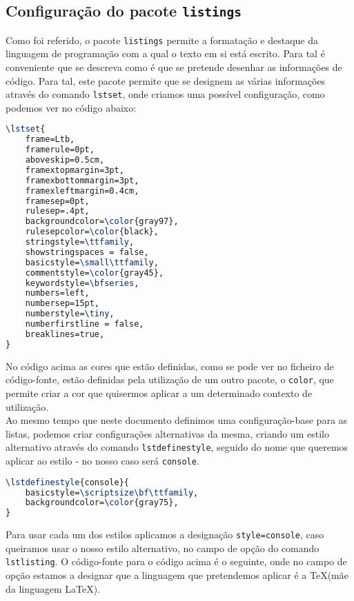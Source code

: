 \documentclass[a4paper, onecolumn, 10pt]{report}
\begin{document}
\subsection{Configuração do pacote \texttt{listings}}

Como foi referido, o pacote \texttt{listings} permite a formatação e destaque da linguagem de programação com a qual o texto em si está escrito. Para tal
é conveniente que se descreva como é que se pretende desenhar as informações de código. Para tal, este pacote permite que se designem as várias informações
através do comando \texttt{lstset}, onde criamos uma possível configuração, como podemos ver no código abaixo:

\begin{lstlisting}[language=TeX]
% style definitions for listings
\lstset{
    frame=Ltb,
    framerule=0pt,
    aboveskip=0.5cm,
    framextopmargin=3pt,
    framexbottommargin=3pt,
    framexleftmargin=0.4cm,
    framesep=0pt,
    rulesep=.4pt,
    backgroundcolor=\color{gray97},
    rulesepcolor=\color{black},
    stringstyle=\ttfamily,
    showstringspaces = false,
    basicstyle=\small\ttfamily,
    commentstyle=\color{gray45},
    keywordstyle=\bfseries,
    numbers=left,
    numbersep=15pt,
    numberstyle=\tiny,
    numberfirstline = false,
    breaklines=true,
}
\end{lstlisting}

No código acima as cores que estão definidas, como se pode ver no ficheiro de código-fonte, estão definidas pela utilização de um outro pacote, o
\texttt{color}, que permite criar a cor que quisermos aplicar a um determinado contexto de utilização. \\
Ao mesmo tempo que neste documento definimos uma configuração-base para as listas, podemos criar configurações alternativas da mesma, criando um estilo
alternativo através do comando \texttt{lstdefinestyle}, seguido do nome que queremos aplicar ao estilo - no nosso caso será \texttt{console}.

\begin{lstlisting}[language=TeX]
\lstdefinestyle{console}{
    basicstyle=\scriptsize\bf\ttfamily,
    backgroundcolor=\color{gray75},
}
\end{lstlisting}

Para usar cada um dos estilos aplicamos a designação \texttt{style=console}, caso queiramos usar o nosso estilo alternativo, no campo de opção do comando
\texttt{lstlisting}. O código-fonte para o código acima é o seguinte, onde no campo de opção estamos a designar que a linguagem que pretendemos aplicar é a
\TeX (mãe da linguagem \LaTeX).
\end{document}

